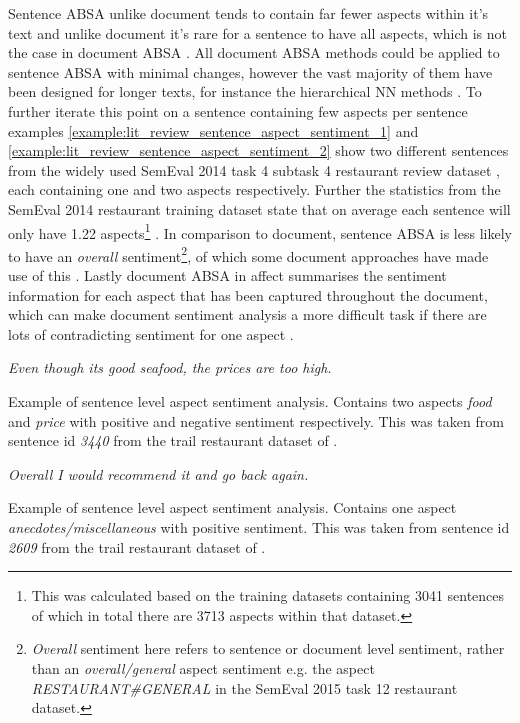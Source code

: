 Sentence ABSA unlike document tends to contain far fewer aspects within it's text and unlike document it's rare for a sentence to have all aspects, which is not the case in document ABSA \citep{snyder-barzilay-2007-multiple, Wang2010LatentAR}. All document ABSA methods could be applied to sentence ABSA with minimal changes, however the vast majority of them have been designed for longer texts, for instance the hierarchical NN methods \citep{yin-etal-2017-document, li-etal-2018-document, wang-etal-2019-human}. To further iterate this point on a sentence containing few aspects per sentence examples \ref{example:lit_review_sentence_aspect_sentiment_1} and \ref{example:lit_review_sentence_aspect_sentiment_2} show two different sentences from the widely used SemEval 2014 task 4 subtask 4 restaurant review dataset \citep{pontiki-etal-2014-semeval}, each containing one and two aspects respectively. Further the statistics from the SemEval 2014 restaurant training dataset state that on average each sentence will only have 1.22 aspects\footnote{This was calculated based on the training datasets containing 3041 sentences of which in total there are 3713 aspects within that dataset.} \citep{pontiki-etal-2014-semeval}. In comparison to document, sentence ABSA is less likely to have an \textit{overall} sentiment\footnote{\textit{Overall} sentiment here refers to sentence or document level sentiment, rather than an \textit{overall/general} aspect sentiment e.g. the aspect \textit{RESTAURANT\#GENERAL} in the SemEval 2015 task 12 restaurant dataset\citep{pontiki-etal-2015-semeval}.}, of which some document approaches have made use of this \citep{Wang2010LatentAR, li-etal-2018-document}. Lastly document ABSA in affect summarises the sentiment information for each aspect that has been captured throughout the document, which can make document sentiment analysis a more difficult task if there are lots of contradicting sentiment for one aspect \citep{pontiki-etal-2016-semeval}.  


\begin{example}
\textit{Even though its good seafood, the prices are too high.}
\caption{Example of sentence level aspect sentiment analysis. Contains two aspects \textit{food} and \textit{price} with positive and negative sentiment respectively. This was taken from sentence id \textit{3440} from the trail restaurant dataset of \citet{pontiki-etal-2014-semeval}.}
\label{example:lit_review_sentence_aspect_sentiment_1}
\end{example}

\begin{example}
\textit{Overall I would recommend it and go back again.}
\caption{Example of sentence level aspect sentiment analysis. Contains one aspect \textit{anecdotes/miscellaneous} with positive sentiment. This was taken from sentence id \textit{2609} from the trail restaurant dataset of \citet{pontiki-etal-2014-semeval}.}
\label{example:lit_review_sentence_aspect_sentiment_2}
\end{example}

